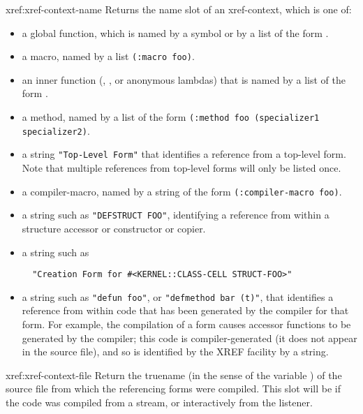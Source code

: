 \begin{defun}{xref:}{xref-context-name}{\args {}}
  Returns the name slot of an xref-context, which is one of:
\begin{itemize}
\item
a global function, which is named by a symbol or by a list of the form
. 

\item
a macro, named by a list \verb|(:macro foo)|.

\item
an inner function (, , or anonymous lambdas) that
is named by a list of the form .

\item
a method, named by a list of the form
\verb|(:method foo (specializer1 specializer2)|. 

\item
a string \verb|"Top-Level Form"| that identifies a reference from a
top-level form. Note that multiple references from top-level forms
will only be listed once. 

\item
a compiler-macro, named by a string of the form
\verb|(:compiler-macro foo)|. 

\item
a string such as \verb|"DEFSTRUCT FOO"|, identifying a reference from
within a structure accessor or constructor or copier.

\item
a string such as 
\begin{verbatim}
  "Creation Form for #<KERNEL::CLASS-CELL STRUCT-FOO>"
\end{verbatim}

\item
a string such as \verb|"defun foo"|, or \verb|"defmethod bar (t)"|,
that identifies a reference from within code that has been generated
by the compiler for that form. For example, the compilation of a
 form causes accessor functions to be generated by the
compiler; this code is compiler-generated (it does not appear in the
source file), and so is identified by the XREF facility by a string. 
\end{itemize}
\end{defun}


\begin{defun}{xref:}{xref-context-file}{}
  Return the truename (in the sense of the variable
   ) of the source file from which the
   referencing forms were compiled. This slot will be \nil{} if the
   code was compiled from a stream, or interactively from the
   listener.
\end{defun}

